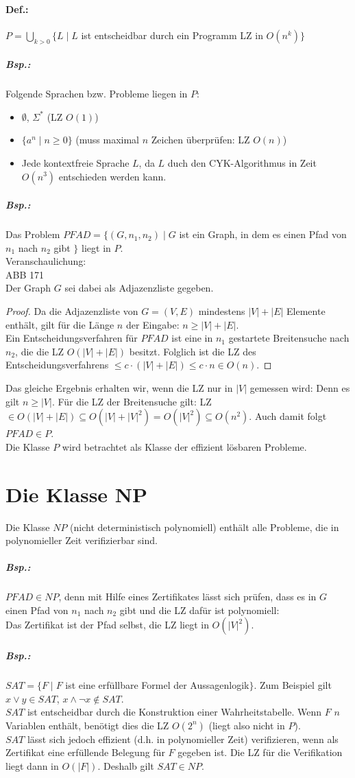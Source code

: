 \paragraph{Def.:} $P=\bigcup_{k>0} \{ L\;|\; L$ ist entscheidbar durch ein Programm LZ in $O(n^k)\}$
\subparagraph{Bsp.:} Folgende Sprachen bzw. Probleme liegen in $P$:
\begin{itemize}
\item $\emptyset$, $\Sigma^*$ (LZ $O(1)$)
\item $\{a^n\;| \; n\geq 0\}$ (muss maximal $n$ Zeichen überprüfen: LZ $O(n)$)
\item Jede kontextfreie Sprache $L$, da $L$ duch den CYK-Algorithmus in Zeit $O(n^3)$ entschieden werden kann.
\end{itemize}
\subparagraph{Bsp.:} Das Problem $PFAD=\{(G,n_1,n_2)\;|\; G$ ist ein Graph, in dem es einen Pfad von $n_1$ nach $n_2$ gibt $\}$ liegt in $P$.\\
Veranschaulichung:\\
ABB 171\\
Der Graph $G$ sei dabei als Adjazenzliste gegeben.
\begin{proof}
Da die Adjazenzliste von $G=(V,E)$ mindestens $|V|+|E|$ Elemente enthält, gilt für die Länge $n$ der Eingabe: $n\geq |V|+|E|$.\\
Ein Entscheidungsverfahren für $PFAD$ ist eine in $n_1$ gestartete Breitensuche nach $n_2$, die die LZ $O(|V|+|E|)$ besitzt. Folglich ist die LZ des Entscheidungsverfahrens $\leq c \cdot (|V|+|E|) \leq c \cdot n \in O(n)$. 
\end{proof}
Das gleiche Ergebnis erhalten wir, wenn die LZ nur in $|V|$ gemessen wird: Denn es gilt $n \geq |V|$. Für die LZ der Breitensuche gilt: LZ$\in O(|V|+|E|)\subseteq O (|V|+|V|^2)=O(|V|^2)\subseteq O(n^2)$.  Auch damit folgt $PFAD \in P$.\medskip\\
Die Klasse $P$ wird betrachtet als Klasse der effizient lösbaren Probleme.

\section{Die Klasse NP}
Die Klasse $NP$ (nicht deterministisch polynomiell) enthält alle Probleme, die in polynomieller Zeit verifizierbar sind.
\subparagraph{Bsp.:} $PFAD \in NP$, denn mit Hilfe eines Zertifikates lässt sich prüfen, dass es in $G$ einen Pfad von $n_1$ nach $n_2$ gibt und die LZ dafür ist polynomiell:\\
Das Zertifikat ist der Pfad selbst, die LZ liegt in $O(|V|^2)$.
\subparagraph{Bsp.:} $SAT=\{F\;|\;F$ ist eine erfüllbare Formel der Aussagenlogik$\}$. Zum Beispiel gilt $x\vee y \in SAT$, $x\wedge \neg x \not \in SAT$.\\
$SAT$ ist entscheidbar durch die Konstruktion einer Wahrheitstabelle. Wenn $F$ $n$ Variablen enthält, benötigt dies die LZ $O(2^n)$ (liegt also nicht in $P$).\\
$SAT$ lässt sich jedoch effizient (d.h. in polynomieller Zeit) verifizieren, wenn als Zertifikat eine erfüllende Belegung für $F$ gegeben ist. Die LZ für die Verifikation liegt dann in $O(|F|)$. Deshalb gilt $SAT \in NP$.

\newpage
\printbibliography

